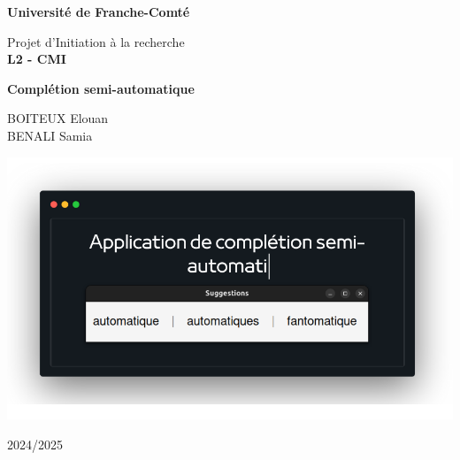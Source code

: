 \documentclass[a4paper, 11pt]{report}
\begin{document}
\begin{titlepage}
	\centering
	{\Huge \textbf{Université de Franche-Comté} \par}
	\vspace{1cm}
	{\huge \texttt{}{Projet d'Initiation à la recherche\\ } \LARGE{\textbf{L2 - CMI}} \par}
	\vspace{1cm}
	{\huge \textbf{Complétion semi-automatique} \par}
	\vspace{1cm}
	{\Large BOITEUX Elouan\\BENALI Samia\par}
	\vspace{0.5cm}
	\begin{center}
		{\includegraphics[height=0.55\textwidth]{images/illustration.png}}
	\end{center}

	\begin{minipage}[c]{0.40\textwidth}
		\centering
	\end{minipage}
	\hfill
	\begin{minipage}[c]{0.5\textwidth}
		\centering
	\end{minipage}
	\vfill
	{2024/2025}
\end{titlepage}
\end{document}
